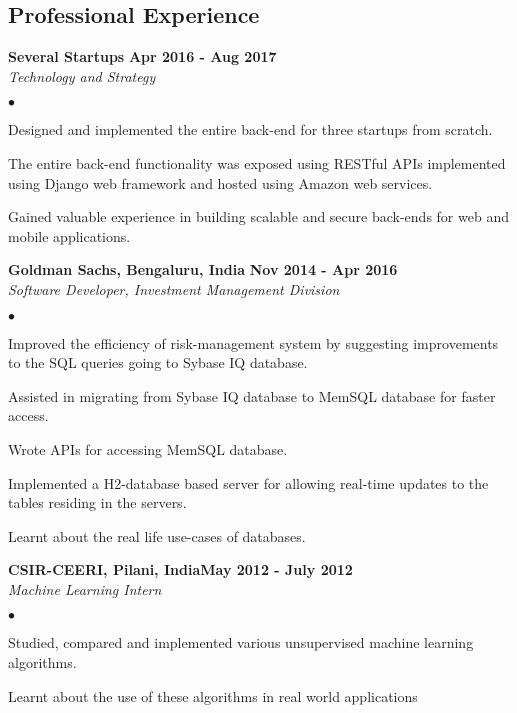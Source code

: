 \documentclass[margin,line]{res}
\newenvironment{list2}{
  \begin{list}{$\bullet$}{%
      \setlength{\itemsep}{0in}
      \setlength{\parsep}{0in} \setlength{\parskip}{0in}
      \setlength{\topsep}{0in} \setlength{\partopsep}{0in} 
      \setlength{\leftmargin}{0.2in}}}{\end{list}}
\begin{document}
\begin{resume}
\section{\sc Professional Experience}



{\bf Several Startups} \hfill {\bf Apr 2016 - Aug 2017}\\
{\em Technology and Strategy}
\vspace{.3cm}
\begin{list2}
\item Designed and implemented the entire back-end for three startups from scratch.
\item The entire back-end functionality was exposed using RESTful APIs implemented using Django web framework and hosted using Amazon web services.
\item Gained valuable experience in building scalable and secure back-ends for web and mobile applications.
\end{list2}

{\bf Goldman Sachs, Bengaluru, India} \hfill {\bf Nov 2014 - Apr 2016}\\
{\em Software Developer, Investment Management Division}
\vspace{.3cm}
\begin{list2}
\item Improved the efficiency of risk-management system by suggesting improvements to the SQL
queries going to Sybase IQ database.
\item Assisted in migrating from Sybase IQ database to MemSQL database for faster access.
\item Wrote APIs for accessing MemSQL database.
\item Implemented a H2-database based server for allowing real-time updates to the tables residing in
the servers.
\item Learnt about the real life use-cases of databases.
\end{list2}

{\bf CSIR-CEERI, Pilani, India}\hfill {\bf May 2012 - July 2012}\\
{\em Machine Learning Intern}
\vspace{.3cm}
\begin{list2}
\item Studied, compared and implemented various unsupervised machine learning algorithms.
\item Learnt about the use of these algorithms in real world applications
\end{list2}


\end{resume}
\end{document}
